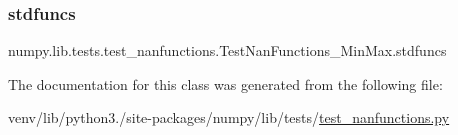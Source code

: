 \subsubsection{\texorpdfstring{stdfuncs}{stdfuncs}}
{\footnotesize\ttfamily numpy.\+lib.\+tests.\+test\+\_\+nanfunctions.\+Test\+Nan\+Functions\+\_\+\+Min\+Max.\+stdfuncs\hspace{0.3cm}{\ttfamily [static]}}



The documentation for this class was generated from the following file\+:\begin{DoxyCompactItemize}
\item 
venv/lib/python3./site-\/packages/numpy/lib/tests/\hyperlink{test__nanfunctions_8py}{test\+\_\+nanfunctions.\+py}\end{DoxyCompactItemize}
